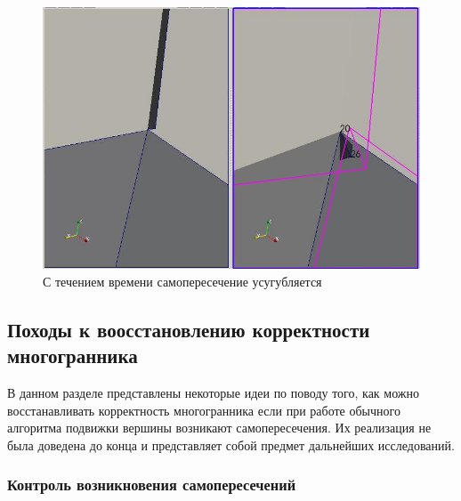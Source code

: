 \documentclass[a4paper,12pt, titlepage]{article}
\begin{document}
\begin{flushleft}
  \begin{figure}[p]
    \includegraphics[clip, width=13cm]{img/consections-5.jpeg}
    \caption{С течением времени самопересечение усугубляется}\label{consections-5}
  \end{figure}
\end{flushleft}




 

\newpage
\subsection{Походы к воосстановлению корректности многогранника}

\begin{flushleft}
 В данном разделе представлены некоторые идеи по поводу того, как можно восстанавливать корректность
многогранника если при работе обычного алгоритма подвижки вершины возникают самопересечения. Их реализация не была
доведена до конца и представляет собой предмет дальнейших исследований.
\end{flushleft}

\subsubsection{Контроль возникновения самопересечений}
\end{document}
